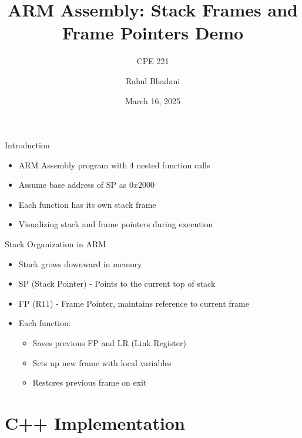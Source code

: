 \documentclass[aspectratio=169]{beamer}
\title{ARM Assembly: Stack Frames and Frame Pointers Demo}
\subtitle{CPE 221}
\author{Rahul Bhadani}
\institute{The University of Alabama in Huntsville}
\date{March 16, 2025}
\begin{document}
\begin{frame}

    \titlepage

\end{frame}

\begin{frame}{}
    \tableofcontents
\end{frame}

\begin{frame}{Introduction}
    \begin{itemize}
    \item ARM Assembly program with 4 nested function calls
    \item Assume base address of SP as $0x2000$
    \item Each function has its own stack frame
    \item Visualizing stack and frame pointers during execution
    \end{itemize}
    
\end{frame}

    \begin{frame}{Stack Organization in ARM}
    \begin{itemize}
    \item Stack grows downward in memory
    \item SP (Stack Pointer) - Points to the current top of stack
    \item FP (R11) - Frame Pointer, maintains reference to current frame
    \item Each function:
        \begin{itemize}
        \item Saves previous FP and LR (Link Register)
        \item Sets up new frame with local variables
        \item Restores previous frame on exit
        \end{itemize}
    \end{itemize}
    \end{frame}

        

\section{C++ Implementation}
\end{document}
